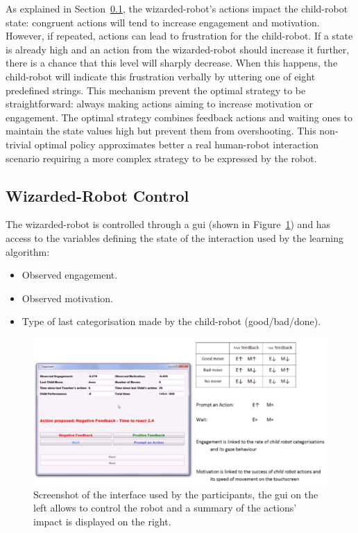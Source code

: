 As explained in Section~\ref{ssec:woz_wizarded_robot}, the wizarded-robot's actions impact the child-robot state: congruent actions will tend to increase engagement and motivation. However, if repeated, actions can lead to frustration for the child-robot. If a state is already high and an action from the wizarded-robot should increase it further, there is a chance that this level will sharply decrease. When this happens, the child-robot will indicate this frustration verbally by uttering one of eight predefined strings. This mechanism prevent the optimal strategy to be straightforward: always making actions aiming to increase motivation or engagement. The optimal strategy combines feedback actions and waiting ones to maintain the state values high but prevent them from overshooting. This non-trivial optimal policy approximates better a real human-robot interaction scenario requiring a more complex strategy to be expressed by the robot.

\subsection{Wizarded-Robot Control}

\label{ssec:woz_wizarded_robot}
The wizarded-robot is controlled through a \gls{gui} (shown in Figure~\ref{fig:woz_gui}) and has access to the variables defining the state of the interaction used by the learning algorithm:
\begin{itemize}
	\item Observed engagement.
	\item Observed motivation.
	\item Type of last categorisation made by the child-robot (good/bad/done).
\end{itemize}

\begin{figure}[ht]
	\centering
	\includegraphics[width=1\textwidth]{GUI-woz.png}
	\caption{Screenshot of the interface used by the participants, the \gls{gui} on the left allows to control the robot and a summary of the actions' impact is displayed on the right.}
	\label{fig:woz_gui}
\end{figure}

